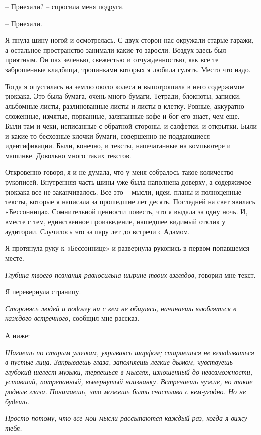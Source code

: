 \documentclass[
]{book}
\begin{document}
-- Приехали? -- спросила меня подруга.

-- Приехали.

Я пнула шину ногой и осмотрелась. С двух сторон нас окружали старые гаражи, а остальное пространство занимали какие-то заросли. Воздух здесь был приятным. Он пах зеленью, свежестью и отчужденностью, как все те заброшенные кладбища, тропинками которых я любила гулять. Место что надо.

Тогда я опустилась на землю около колеса и выпотрошила в него содержимое рюкзака. Это была бумага, очень много бумаги. Тетради, блокноты, записки, альбомные листы, разлинованные листы и листы в клетку. Ровные, аккуратно сложенные, измятые, порванные, заляпанные кофе и бог его знает, чем еще. Были там и чеки, исписанные с обратной стороны, и салфетки, и открытки. Были и какие-то бесхозные клочки бумаги, совершенно не поддающиеся идентификации. Были, конечно, и тексты, напечатанные на компьютере и машинке. Довольно много таких текстов.

Откровенно говоря, я и не думала, что у меня собралось такое количество рукописей. Внутренняя часть шины уже была наполнена доверху, а содержимое рюкзака все не заканчивалось. Все это -- мысли, идеи, планы и полноценные тексты, которые я написала за прошедшие лет десять. Последней на свет явилась «Бессонница». Сомнительной ценности повесть, что я выдала за одну ночь. И, вместе с тем, единственное произведение, нашедшее видимый отклик у аудитории. Случилось это за пару лет до встречи с Адамом.

Я протянула руку к «Бессоннице» и развернула рукопись в первом попавшемся месте.

\emph{Глубина твоего познания равносильна ширине твоих взглядов}, говорил мне текст.

Я перевернула страницу.

\emph{Сторонясь людей и подолгу ни с кем не общаясь, начинаешь влюбляться в каждого встречного}, сообщил мне рассказ.

А ниже:

\emph{Шагаешь по старым улочкам, укрываясь шарфом; стараешься не вглядываться в пустые лица. Закрываешь глаза, заполняешь легкие дымом, чувствуешь глубокий шелест музыки, теряешься в мыслях, изношенный до невозможности, уставший, потрепанный, вывернутый наизнанку. Встречаешь чужие, но такие родные глаза. Понимаешь, что можешь быть счастлива с кем-угодно. Но не будешь. }

\emph{Просто потому, что все мои мысли рассыпаются каждый раз, когда я вижу тебя.}
\end{document}
